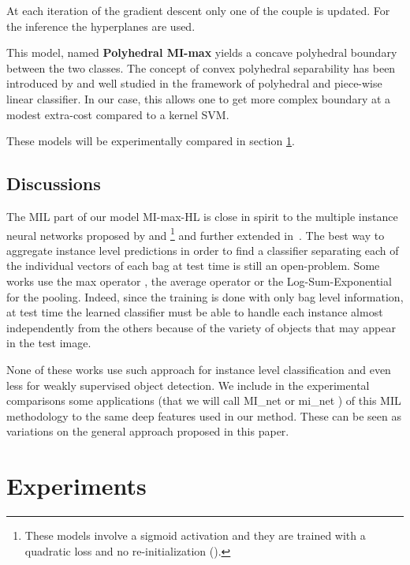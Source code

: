 \documentclass[preprint]{elsarticle}
\newcommand\mimaxaddlayerS{MI-max-HL}
\newcommand\MaxOfMaxS{Polyhedral MI-max}
\begin{document}
At each iteration of the gradient descent only one of the couple  is updated. For the inference the  hyperplanes are used. 

This model, named \textbf{\MaxOfMaxS{}} yields a concave polyhedral boundary between the two classes.  The concept of convex polyhedral separability has been introduced by \cite{megiddo_complexity_1988} and well studied in the framework of polyhedral and piece-wise linear classifier. In our case, this allows one to get more complex boundary at a modest extra-cost compared to a kernel SVM. 

These models will be experimentally compared in section \ref{sec:experiments}. 


\subsection{Discussions}

The MIL part of our model \mimaxaddlayerS{} is close in spirit to the multiple instance neural networks proposed by \cite{ramon_multi_2000} and \cite{zhou_neural_2002}\footnote{These models involve a sigmoid activation and they are trained with a quadratic loss  and no re-initialization ().} and further extended in~\citep{wang_revisiting_2018}. 
The best way to aggregate instance level predictions in order to find a classifier separating each of the individual vectors  of each bag at test time is still an open-problem. Some works use the max operator \citep{zhou_neural_2002}, the average operator or the Log-Sum-Exponential \citep{ramon_multi_2000} for the pooling. Indeed, since the training is done with only bag level information, at test time the learned classifier must be able to handle each instance almost independently from the others because of the variety of objects that may appear in the test image. 

None of these works use such approach for instance level classification and even less for weakly supervised object detection. We include in the experimental comparisons some applications (that we will call MI\_net or mi\_net \citep{wang_revisiting_2018}) of this MIL methodology to the same deep features used in our method. These can be seen as variations on the general approach proposed in this paper.  



\section{Experiments}
\label{sec:experiments}
\end{document}
